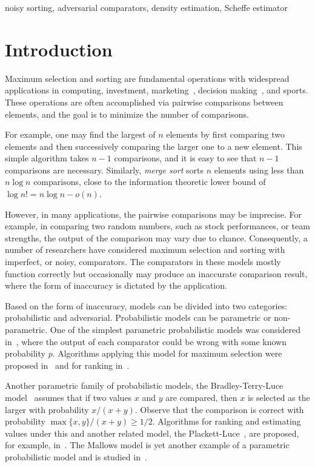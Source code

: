 \documentclass[twoside,11pt]{article}
\begin{document}
\begin{keywords}
noisy sorting, adversarial comparators, density estimation, Scheffe estimator 
\end{keywords}

\section{Introduction}
Maximum selection and sorting are fundamental operations with widespread
applications in computing, investment, marketing~\citep{AMPP09}, decision
making~\citep{Thurstone27,David63}, and sports.
These operations are often accomplished via pairwise
comparisons between elements, and the goal is to minimize the
number of comparisons.

For example, one may find the largest of $n$ elements by first
comparing two elements and then successively comparing the larger one
to a new element.  This simple algorithm takes $n-1$ comparisons, and
it is easy to see that $n-1$ comparisons are necessary.  Similarly,
\emph{merge sort} sorts $n$ elements using less than $n\log n$
comparisons, close to the information theoretic lower bound of $\log
n!=n\log n -o(n)$.

However, in many applications, the pairwise comparisons may be
imprecise. For example, in comparing two random numbers, such
as stock performances, or team strengths, the output of the
comparison may vary due to chance. 
Consequently, a number of researchers have considered
maximum selection and sorting with imperfect, or noisy, comparators.
The comparators in these models mostly function correctly but
occasionally may produce an inaccurate comparison result,
where the form of inaccuracy is dictated by the application.

Based on the form of inaccuracy, models can be divided into two
categories: probabilistic and adversarial. Probabilistic models can
be parametric or non-parametric. One of the simplest parametric
probabilistic models was considered in~\citet{feige94}, where the
output of each comparator could be wrong with some known probability
$p$. Algorithms applying this model for maximum selection were
proposed in~\citet{AdlerGHKK94} and for ranking
in~\citet{KarpK07,ben08,BravermanM08,braverman16}.

Another parametric family of probabilistic models, the Bradley-Terry-Luce
model~\citep{BradleyT52} assumes that if two values $x$ and $y$ are
compared, then $x$ is selected as the larger with probability
$x/(x+y)$.  Observe that the comparison is correct with probability
$\max\{x,y\}/(x+y)\ge 1/2$.  Algorithms for ranking and estimating 
values under this and another related model,
the Plackett-Luce~\citep{plackett75,luce05}, are proposed, for example, 
in~\citet{NegahbanOS12,szorenyi15}. The Mallows model is yet another example of a parametric probabilistic model and is studied in~\citet{busa14}. 
\end{document}
